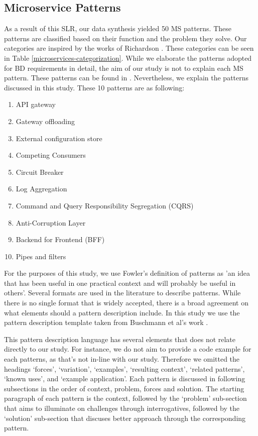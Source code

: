 \documentclass{bmcart}
\begin{document}
\subsection{Microservice Patterns}



As a result of this SLR, our data synthesis yielded 50 MS patterns. These patterns are classified based on their function and the problem they solve. Our categories are inspired by the works of Richardson \cite{Richardson.2022}. These categories can be seen in Table \ref{microservices-categorization}. While we elaborate the patterns adopted for BD requirements in detail, the aim of our study is not to explain each MS pattern. These patterns can be found in \cite{richardson2018microservices}. Nevertheless, we explain the patterns discussed in this study. These 10 patterns are as following: 

\begin{enumerate}
  \item API gateway 
  \item Gateway offloading 
  \item External configuration store
  \item Competing Consumers
  \item Circuit Breaker
  \item Log Aggregation
  \item Command and Query Responsibility Segregation (CQRS)
  \item Anti-Corruption Layer
  \item Backend for Frontend (BFF)
  \item Pipes and filters
\end{enumerate}
  
\hspace{1cm}

For the purposes of this study, we use Fowler's definition \cite{fowler1997analysis} of patterns as 'an idea that has been useful in one practical context and will probably be useful in others'. Several formats are used in the literature to describe patterns. While there is no single format that is widely accepted, there is a broad agreement on what elements should a pattern description include. In this study we use the pattern description template taken from Buschmann et al's work \cite{buschmann2008pattern}. 

This pattern description language has several elements that does not relate directly to our study. For instance, we do not aim to provide a code example for each patterns, as that's not in-line with our study. Therefore we omitted the headings `forces', `variation', `examples', `resulting context', `related patterns', `known uses', and `example application'. Each pattern is discussed in following subsections in the order of context, problem, forces and solution. The starting paragraph of each pattern is the context, followed by the `problem' sub-section that aims to illuminate on challenges through interrogatives, followed by the `solution' sub-section that discuses better approach through the corresponding pattern.
\end{document}
